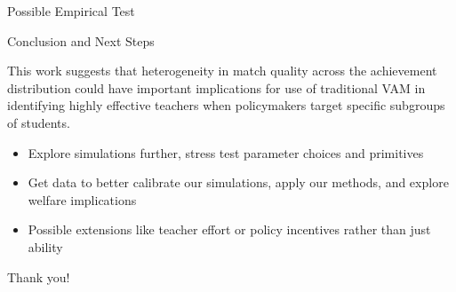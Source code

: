 \documentclass[11pt]{beamer}
\begin{document}

\begin{frame}{Possible Empirical Test}

    

\end{frame}



\begin{frame}{Conclusion and Next Steps}

    
    This work suggests that heterogeneity in match quality across the achievement distribution could have important implications for use of traditional VAM in identifying highly effective teachers when policymakers target specific subgroups of students.

    \begin{itemize}
        \item Explore simulations further, stress test parameter choices and primitives
        \item Get data to better calibrate our simulations, apply our methods, and explore welfare implications
        \item Possible extensions like teacher effort or policy incentives rather than just ability
    \end{itemize}

\end{frame}



\begin{frame}{}

    \centering
    \Huge Thank you!

\end{frame}
\end{document}
